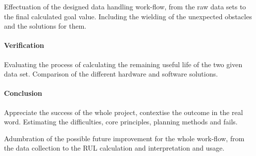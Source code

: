 Effectuation of the designed data handling work-flow, from the raw data sets to the final calculated goal value. Including the wielding of the unexpected obstacles and the solutions for them.

		\paragraph{Verification}

Evaluating the process of calculating the remaining useful life of the two given data set. Comparison of the different hardware and software solutions.

		\paragraph{Conclusion}

Appreciate the success of the whole project, contextise the outcome in the real word. Estimating the difficulties, core principles, planning methods and fails.

Adumbration of the possible future improvement for the whole work-flow, from the data collection to the RUL calculation and interpretation and usage.

